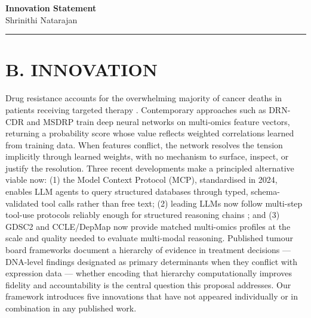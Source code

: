 \documentclass[12pt, letterpaper]{article}
\begin{document}
\begin{center}
    {\LARGE\bfseries Innovation Statement}\\
    \vspace{0.3em}
    {\normalsize Shrinithi Natarajan}
\end{center}

\vspace{0.5em}
\hrule
\vspace{0.8em}

\section*{B. INNOVATION}

Drug resistance accounts for the overwhelming majority of cancer deaths in patients receiving
targeted therapy \cite{liu2025multiomics, mao2025ai}. Contemporary approaches such as DRN-CDR
\cite{saranya2024drncdr} and MSDRP \cite{zhao2023msdrp} train deep neural networks on multi-omics
feature vectors, returning a probability score whose value reflects weighted correlations learned
from training data. When features conflict, the
network resolves the tension implicitly through learned weights, with no mechanism to surface,
inspect, or justify the resolution. Three recent developments make a principled alternative
viable now: (1) the Model Context Protocol (MCP), standardised in 2024, enables LLM agents to
query structured databases through typed, schema-validated tool calls rather than free text;
(2) leading LLMs now follow multi-step tool-use protocols reliably enough for structured
reasoning chains \cite{flotho2026mcpmed, widjaja2025bioinformcp}; and (3) GDSC2 and CCLE/DepMap now provide matched multi-omics profiles at
the scale and quality needed to evaluate multi-modal reasoning. Published tumour board frameworks
document a hierarchy of evidence in treatment decisions --- DNA-level findings designated as
primary determinants when they conflict with expression data \cite{evomdt2026, han2024consensus,
lorenzo2026oncotimia} --- whether encoding that hierarchy computationally improves fidelity and
accountability is the central question this proposal addresses. Our framework introduces five
innovations that have not appeared individually or in combination in any published work.
\end{document}
